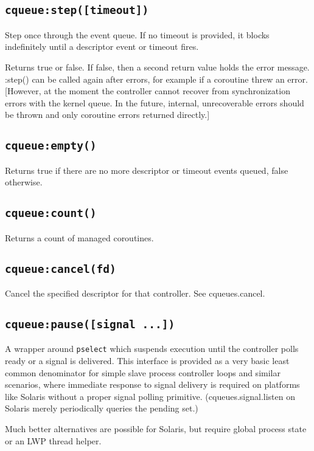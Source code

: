 \documentclass[11pt, oneside]{memoir}
\newcommand*{\syscall}[1]{\texttt{#1}\xspace}
\newcommand*{\routine}[1]{\texttt{#1}\xspace}
\begin{document}
\subsection[\routine{cqueues:step}]{\routine{cqueue:step([timeout])}}
Step once through the event queue. If no timeout is provided, it blocks indefinitely until a descriptor event or timeout fires.

Returns true or false. If false, then a second return value holds the error message. :step() can be called again after errors, for example if a coroutine threw an error. [However, at the moment the controller cannot recover from synchronization errors with the kernel queue. In the future, internal, unrecoverable errors should be thrown and only coroutine errors returned directly.]

\subsection[\routine{cqueues:empty}]{\routine{cqueue:empty()}}
Returns true if there are no more descriptor or timeout events queued, false otherwise.

\subsection[\routine{cqueues:count}]{\routine{cqueue:count()}}
Returns a count of managed coroutines.

\subsection[\routine{cqueues:cancel}]{\routine{cqueue:cancel(fd)}}
Cancel the specified descriptor for that controller. See cqueues.cancel.

\subsection[\routine{cqueues:pause}]{\routine{cqueue:pause([signal ...])}}
A wrapper around \syscall{pselect} which suspends execution until the controller polls ready or a signal is delivered. This interface is provided as a very basic least common denominator for simple slave process controller loops and similar scenarios, where immediate response to signal delivery is required on platforms like Solaris without a proper signal polling primitive. (cqueues.signal.listen on Solaris merely periodically queries the pending set.)

Much better alternatives are possible for Solaris, but require global process state or an LWP thread helper.
\end{document}
